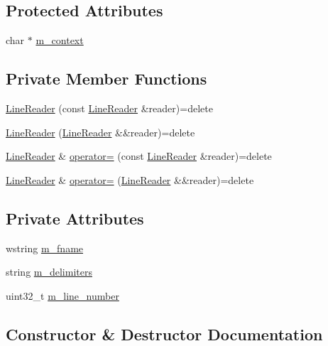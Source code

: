 \subsection*{Protected Attributes}
\begin{DoxyCompactItemize}
\item 
char $\ast$ \hyperlink{classmage_1_1_line_reader_a2f1cfe313dc89741386178e63a6b8b0c}{m\+\_\+context}
\end{DoxyCompactItemize}
\subsection*{Private Member Functions}
\begin{DoxyCompactItemize}
\item 
\hyperlink{classmage_1_1_line_reader_ae4f871bebae110704b34c0bd88460639}{Line\+Reader} (const \hyperlink{classmage_1_1_line_reader}{Line\+Reader} \&reader)=delete
\item 
\hyperlink{classmage_1_1_line_reader_a6447cc854280ade147c6e03e53c15fb1}{Line\+Reader} (\hyperlink{classmage_1_1_line_reader}{Line\+Reader} \&\&reader)=delete
\item 
\hyperlink{classmage_1_1_line_reader}{Line\+Reader} \& \hyperlink{classmage_1_1_line_reader_a2247078d0b5602f9a9a6b74019832faf}{operator=} (const \hyperlink{classmage_1_1_line_reader}{Line\+Reader} \&reader)=delete
\item 
\hyperlink{classmage_1_1_line_reader}{Line\+Reader} \& \hyperlink{classmage_1_1_line_reader_a45504c0ba4238eedf851cfb9df081a01}{operator=} (\hyperlink{classmage_1_1_line_reader}{Line\+Reader} \&\&reader)=delete
\end{DoxyCompactItemize}
\subsection*{Private Attributes}
\begin{DoxyCompactItemize}
\item 
wstring \hyperlink{classmage_1_1_line_reader_ad6f55ba12fc610ab2fc1c26a48d12321}{m\+\_\+fname}
\item 
string \hyperlink{classmage_1_1_line_reader_a6de3398ac59fdd98f8c40cff6f5c1075}{m\+\_\+delimiters}
\item 
uint32\+\_\+t \hyperlink{classmage_1_1_line_reader_ada0b4ec5817b96c6b1bb43bd2573f8ba}{m\+\_\+line\+\_\+number}
\end{DoxyCompactItemize}


\subsection{Constructor \& Destructor Documentation}
\hypertarget{classmage_1_1_line_reader_aa058c338d8256d7f7b775bf4f7052508}{}\label{classmage_1_1_line_reader_aa058c338d8256d7f7b775bf4f7052508} 
